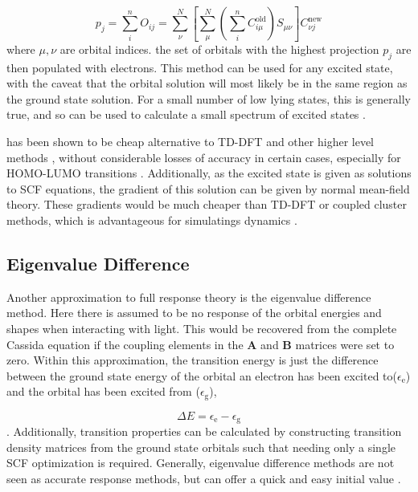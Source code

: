\begin{equation}
p_j = \sum^n_i O_{ij} = \sum^N_\nu \left[\sum^N_\mu\left(\sum^n_i C_{i\mu}^{\text{old}}\right)S_{\mu\nu}\right]C^{\text{new}}_{\nu j}
\end{equation}
%
where $\mu,\nu$ are orbital indices. the set of orbitals with the highest projection
$p_j$ are then populated with electrons.  This method can be used for any
excited state, with the caveat that the orbital solution will most likely be in
the same region as the ground state solution. For a small number of low lying states,
this is generally  true, and so \dscf can be used to calculate a small spectrum of
excited states \cite{Gilbert2008}.

\dscf has been shown to be cheap alternative to TD-DFT and other higher level
methods \cite{Liu2004, Gavnholt2008, Besley2009}, without considerable losses of
accuracy in certain cases, especially for HOMO-LUMO transitions \cite{Kowalczyk2011}.
Additionally, as the excited state is given as solutions to SCF equations,
the gradient of this solution can be given by normal mean-field theory.
These gradients would be much cheaper than TD-DFT or coupled cluster methods, 
which is advantageous for simulatings dynamics \cite{Gavnholt2008}.

\subsection{Eigenvalue Difference}
\label{subsec:eigval_diff}
Another approximation to full response theory is the eigenvalue difference method. 
Here there is assumed to be no response of the orbital energies and shapes when 
interacting with light. This would be recovered from the complete Cassida equation
if the coupling elements in the $\mathbf{A}$ and $\mathbf{B}$ matrices were set to zero.
Within this approximation, the transition energy is just the difference between 
the ground state energy of the orbital an electron has been excited to($\epsilon_{\text{e}}$)
and the orbital has been excited from ($\epsilon_{\text{g}}$),

\begin{equation}
\Delta E = \epsilon_{\text{e}} - \epsilon_{\text{g}}
\end{equation}
%
. Additionally, transition properties can be calculated by constructing transition 
density matrices from the ground state orbitals such that needing only a single 
SCF optimization is required. Generally, eigenvalue difference methods are not 
seen as accurate response methods, but can offer a quick and easy initial value 
\cite{Gimon2009}.

